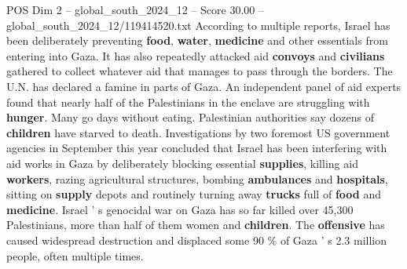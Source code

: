 \begin{textsample}{POS Dim 2 – global\_south\_2024\_12 – Score 30.00 – global\_south\_2024\_12/119414520.txt}
According to multiple reports, Israel has been deliberately preventing \textbf{food}, \textbf{water}, \textbf{medicine} and other essentials from entering into Gaza.
It has also repeatedly attacked aid \textbf{convoys} and \textbf{civilians} gathered to collect whatever aid that manages to pass through the borders.
The U.N. has declared a famine in parts of Gaza.
An independent panel of aid experts found that nearly half of the Palestinians in the enclave are struggling with \textbf{hunger}.
Many go days without eating.
Palestinian authorities say dozens of \textbf{children} have starved to death.
Investigations by two foremost US government agencies in September this year concluded that Israel has been interfering with aid works in Gaza by deliberately blocking essential \textbf{supplies}, killing aid \textbf{workers}, razing agricultural structures, bombing \textbf{ambulances} and \textbf{hospitals}, sitting on \textbf{supply} depots and routinely turning away \textbf{trucks} full of \textbf{food} and \textbf{medicine}.
Israel ' s genocidal war on Gaza has so far killed over 45,300 Palestinians, more than half of them women and \textbf{children}.
The \textbf{offensive} has caused widespread destruction and displaced some 90 \% of Gaza ' s 2.3 million people, often multiple times.

\end{textsample}
